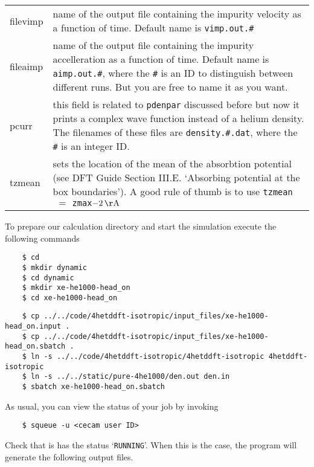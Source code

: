 \documentclass[10pt,a4paper]{article}
\begin{document}
\begin{center}
\begin{tabular}{l|p{9.75cm}}
			filevimp	& name of the output file containing the impurity velocity as a function of time. Default name is \verb|vimp.out.#| \\
			fileaimp	& name of the output file containing the impurity accelleration as a function of time. Default name is \verb|aimp.out.#|, where the \verb|#| is an ID to distinguish between different runs. But you are free to name it as you want. \\
			pcurr	& this field is related to \verb|pdenpar| discussed before but now it prints a complex wave function instead of a helium density. The filenames of these files are \verb|density.#.dat|, where the \verb|#| is an integer ID.\\
			tzmean	& sets the location of the mean of the absorbtion potential (see DFT Guide Section III.E. `Absorbing potential at the box boundaries'). A good rule of thumb is to use \verb|tzmean|$\,\,=\,\,$\verb|zmax|$-2\,\mathrm{\AA}$ \\
		\end{tabular}
	\end{center}

	To prepare our calculation directory and start the simulation execute the following commands
	
	\begin{verbatim}
	$ cd
	$ mkdir dynamic
	$ cd dynamic
	$ mkdir xe-he1000-head_on
	$ cd xe-he1000-head_on
	\end{verbatim}
	
	\begin{verbatim}
	$ cp ../../code/4hetddft-isotropic/input_files/xe-he1000-head_on.input .
	$ cp ../../code/4hetddft-isotropic/input_files/xe-he1000-head_on.sbatch .
	$ ln -s ../../code/4hetddft-isotropic/4hetddft-isotropic 4hetddft-isotropic
	$ ln -s ../../static/pure-4he1000/den.out den.in
	$ sbatch xe-he1000-head_on.sbatch
	\end{verbatim}
	
	As usual, you can view the status of your job by invoking
	\begin{verbatim}
	$ squeue -u <cecam user ID>
	\end{verbatim}
	
	Check that is has the status `\verb|RUNNING|'. When this is the case, the program will generate the following output files.
	
\end{document}
